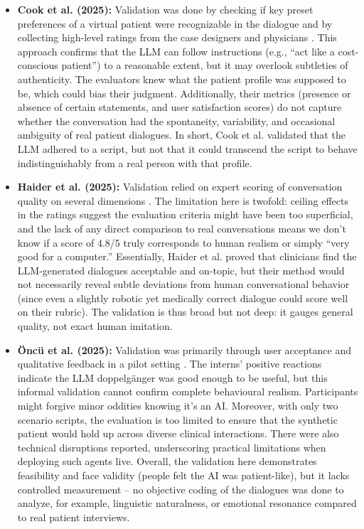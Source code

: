 \begin{itemize}
    \item \textbf{Cook et al. (2025):} Validation was done by checking if key preset preferences of a virtual patient were recognizable in the dialogue and by collecting high-level ratings from the case designers and physicians \cite{Cook2025}. This approach confirms that the LLM can follow instructions (e.g., “act like a cost-conscious patient”) to a reasonable extent, but it may overlook subtleties of authenticity. The evaluators knew what the patient profile was supposed to be, which could bias their judgment. Additionally, their metrics (presence or absence of certain statements, and user satisfaction scores) do not capture whether the conversation had the spontaneity, variability, and occasional ambiguity of real patient dialogues. In short, Cook et al. validated that the LLM adhered to a script, but not that it could transcend the script to behave indistinguishably from a real person with that profile.

    \item \textbf{Haider et al. (2025):} Validation relied on expert scoring of conversation quality on several dimensions \cite{Haider2025}. The limitation here is twofold: ceiling effects in the ratings suggest the evaluation criteria might have been too superficial, and the lack of any direct comparison to real conversations means we don’t know if a score of 4.8/5 truly corresponds to human realism or simply “very good for a computer.” Essentially, Haider et al. proved that clinicians find the LLM-generated dialogues acceptable and on-topic, but their method would not necessarily reveal subtle deviations from human conversational behavior (since even a slightly robotic yet medically correct dialogue could score well on their rubric). The validation is thus broad but not deep: it gauges general quality, not exact human imitation.

    \item \textbf{Öncü et al. (2025):} Validation was primarily through user acceptance and qualitative feedback in a pilot setting \cite{Oncu2025}. The interns’ positive reactions indicate the LLM doppelgänger was good enough to be useful, but this informal validation cannot confirm complete behavioural realism. Participants might forgive minor oddities knowing it’s an AI. Moreover, with only two scenario scripts, the evaluation is too limited to ensure that the synthetic patient would hold up across diverse clinical interactions. There were also technical disruptions reported, underscoring practical limitations when deploying such agents live. Overall, the validation here demonstrates feasibility and face validity (people felt the AI was patient-like), but it lacks controlled measurement – no objective coding of the dialogues was done to analyze, for example, linguistic naturalness, or emotional resonance compared to real patient interviews.
\end{itemize}

